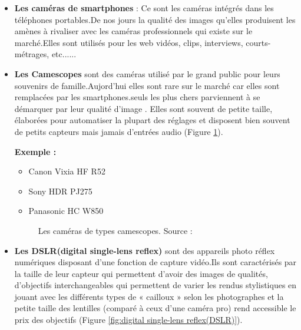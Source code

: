  \begin{itemize}
 	\item \textbf{Les caméras de smartphones} : Ce sont les caméras intégrés dans les téléphones portables.De nos jours la qualité des images qu'elles produisent les amènes à rivaliser avec les caméras professionnels qui existe sur le marché.Elles sont utilisés pour les web vidéos, clips, interviews, courts-métrages, etc......
 	
 	\item \textbf{Les Camescopes} sont des caméras utilisé par le grand public pour leurs souvenirs de famille.Aujord'hui elles sont rare sur le marché car elles sont remplacées par les smartphones.seuls les plus chers parviennent à se démarquer par leur qualité d’image . Elles sont souvent de petite taille, élaborées pour automatiser la plupart des réglages et disposent bien souvent de petits capteurs mais jamais d’entrées audio (Figure \ref{fig:Cmescopes}).
 	
 	\textbf{Exemple :}
 	
 	\begin{itemize}
 		\item Canon Vixia HF R52
 		\item Sony HDR PJ275
 		\item Panasonic HC W850
 	\end{itemize}
 	
 	\begin{figure}[H]%
 		\center%
 		\setlength{\fboxsep}{5pt}%
 		\setlength{\fboxrule}{0.5pt}%
 		\caption[Camescopes]{Les caméras de types camescopes. Source :\cite{noauthor_les_2015}}%
 		\label{fig:Cmescopes}
 	\end{figure}
 	
 	\item \textbf{Les DSLR(digital single-lens reflex)} sont des appareils photo réflex numériques disposant d’une fonction de capture vidéo.Ils sont caractérisés par la taille de leur capteur qui permettent d'avoir des images de qualités, d’objectifs interchangeables qui permettent de varier les rendus stylistiques en jouant avec les différents types de « cailloux » selon les photographes et la petite taille des lentilles (comparé à ceux d’une caméra pro) rend accessible le prix des objectifs (Figure \ref{fig:digital single-lens reflex(DSLR)}).
 	

\end{itemize}
